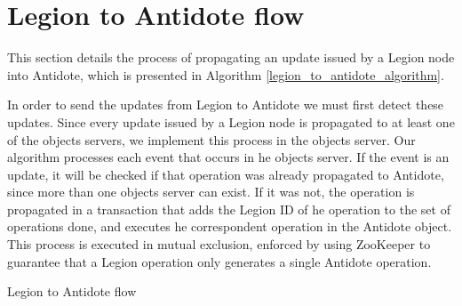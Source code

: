 \section{Legion to Antidote flow}
\label{sec:legion_to_antidote_flow}
This section details the process of propagating an update issued by a Legion node into Antidote, which is presented in Algorithm \ref{legion_to_antidote_algorithm}.\par
	In order to send the updates from Legion to Antidote we must first detect these updates. Since every update issued by a Legion node is propagated to at least one of the objects servers, we implement this process in the objects server. Our algorithm processes each event that occurs in he objects server. If the event is an update, it will be checked if that operation was already propagated to Antidote, since more than one objects server can exist. If it was not, the operation is propagated in a transaction that adds the Legion ID of he operation to the set of operations done, and executes he correspondent operation in the Antidote object. This process is executed in mutual exclusion, enforced by using ZooKeeper to guarantee that a Legion operation only generates a single Antidote operation.
	
\begin{algorithm}[H]
\caption{Legion to Antidote flow}
\label{legion_to_antidote_algorithm}
\begin{algorithmic}[1]
    \EndIf
  \EndIf
\End
\end{algorithmic}
\end{algorithm}


